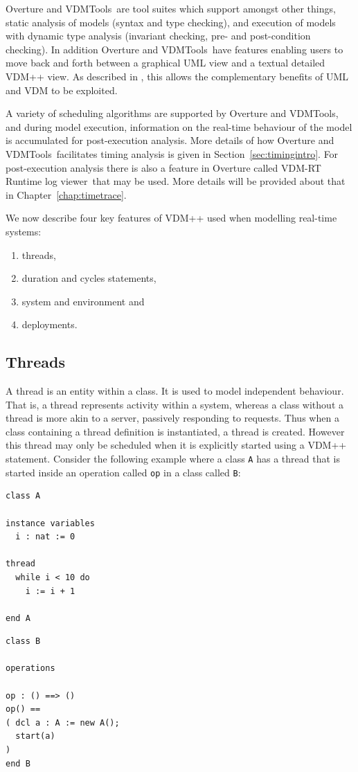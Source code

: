 \documentclass{overturerepchap}
\newcommand{\vdmtools}{VDMTools}
\newcommand{\VDMTools}{VDMTools}
\newcommand{\showtrace}{VDM-RT Runtime log viewer}
\begin{document}
Overture and \VDMTools\ are tool suites which support amongst other
things, static analysis of models (syntax and type checking), and
execution of models with dynamic type analysis (invariant checking,
pre- and post-condition checking). In addition Overture and
\vdmtools\ have features enabling users to move back and forth between
a graphical UML view and a textual detailed VDM++ view. As described
in \cite{Guidelines}, this allows the complementary benefits of UML
and VDM to be exploited.

A variety of scheduling algorithms are supported by Overture and \vdmtools,
and during model execution, information on the real-time behaviour of
the model is accumulated for post-execution analysis. More details of
how Overture and \VDMTools\ facilitates timing analysis is given in
Section~\ref{sec:timingintro}. For post-execution analysis there is also
a feature in Overture
called \showtrace\ that may be used. More details will be
provided about that in Chapter~\ref{chap:timetrace}.

We now describe four key features of VDM++ used when modelling
real-time systems: 
\begin{enumerate}
\item threads,
\item duration and cycles statements,
\item system and environment and
\item deployments.
\end{enumerate}

\subsection{Threads}

A thread is an entity within a class. It is used to model independent
behaviour. That is, a thread represents activity within a system,
whereas a class without a thread is more akin to a server, passively
responding to requests. Thus when a class containing a thread
definition is instantiated, a thread is created. However this thread
may only be scheduled when it is explicitly started using a VDM++
{\bf{}} statement. Consider the following example where a class
\texttt{A} has a thread that is started inside an operation called 
\texttt{op} in a class called \texttt{B}:

\begin{multicols}{2}
\begin{lstlisting}
class A

instance variables
  i : nat := 0

thread
  while i < 10 do
    i := i + 1

end A
\end{lstlisting}
\begin{lstlisting}
class B

operations

op : () ==> ()
op() ==
( dcl a : A := new A();
  start(a)
)
end B
\end{lstlisting}
\end{multicols}
\end{document}
